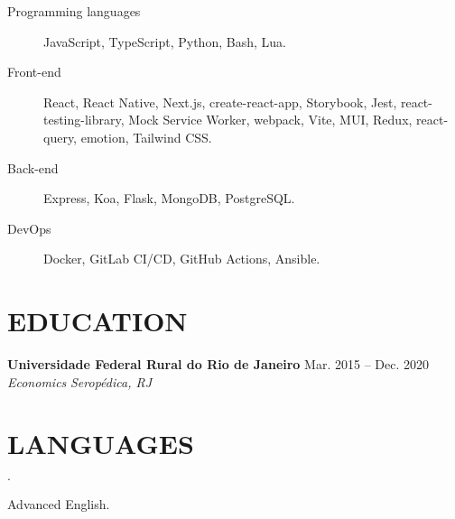 \documentclass[12pt]{article}
\newenvironment{tightlist}
  {\begin{list}
    {$\cdot$}
    {
      \setlength{\leftmargin}{0em}
      \setlength{\itemsep}{\smallskipamount}
    }
  }
{\end{list}}
\begin{document}
\begin{description}
  \item[Programming languages] JavaScript, TypeScript, Python, Bash, Lua.
  \item[Front-end] React, React Native, Next.js, create-react-app, Storybook,
    Jest, react-testing-library, Mock Service Worker, webpack, Vite, MUI, Redux,
    react-query, emotion, Tailwind CSS.
  \item[Back-end] Express, Koa, Flask, MongoDB, PostgreSQL.
  \item[DevOps] Docker, GitLab CI/CD, GitHub Actions, Ansible.
\end{description}

\section*{EDUCATION}

\textbf{Universidade Federal Rural do Rio de Janeiro} \hfill {Mar. 2015 -- Dec. 2020} \\
\textit{Economics} \hfill \textit{Seropédica, RJ} {\parfillskip=0pt\par}

\section*{LANGUAGES}

\begin{tightlist}
  \item Advanced English.
\end{tightlist}
\end{document}
